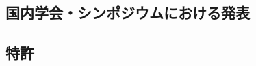 \documentclass[11pt,a4paper,uplatex,twoside,dvipdfmx]{ujarticle} 	%
\renewcommand{\emph}[1]{{\sffamily\gtfamily\bfseries #1}}
\newcommand{\研究課題名}{\mgfamily ストカスティック形式、原始ブラックホール、重力波観測から迫るインフレーション}
\newcommand{\研究機関名}{\mgfamily 名古屋大学}
\newcommand{\申請者氏名}{\mgfamily 多田 祐一郎}
\newcommand{\研究代表者氏名}{\申請者氏名}
\newcommand{\研究期間の最終元号年度}{34}	%
\begin{document}
\subsection{国内学会・シンポジウムにおける発表}
\newcommand{\国内学会やシンポジウムにおける発表}{%
	
	\vspace{-5pt}
	\begin{enumerate} \itemsep-1mm
		\item[] (口頭・招待)
		\item 川崎雅裕, \underline{多田祐一郎},
		``Can massive primordial black holes be produced in mild waterfall hybrid inflation?",
		松江素粒子物理学研究会, 島根大学,
		2016年3月
		\item[] (口頭・査読なし)
		\item 北嶋直弥, \underline{多田祐一郎}, 高橋史宜,
		「極長ストカスティックインフレーション」,
		日本物理学会 第75回年次大会, 名古屋大学
		2020年3月
		\item[] \emph{他8件}
	\end{enumerate}
	
}

\subsection{特許}
\newcommand{\特許等}{%
	$\,\,$なし

}
\end{document}
